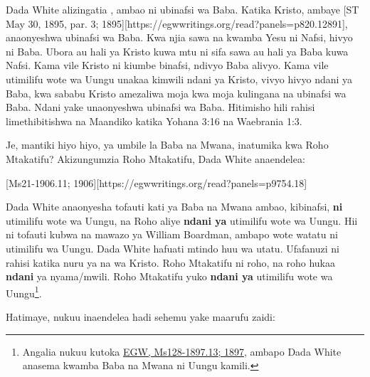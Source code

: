 Dada White alizingatia , ambao ni ubinafsi wa Baba. Katika Kristo, ambaye [ST May 30, 1895, par. 3; 1895][https://egwwritings.org/read?panels=p820.12891], anaonyeshwa ubinafsi wa Baba. Kwa njia sawa na kwamba Yesu ni Nafsi, hivyo ni Baba. Ubora au hali ya Kristo kuwa mtu ni sifa sawa au hali ya Baba kuwa Nafsi. Kama vile Kristo ni kiumbe binafsi, ndivyo Baba alivyo. Kama vile utimilifu wote wa Uungu unakaa kimwili ndani ya Kristo, vivyo hivyo ndani ya Baba, kwa sababu Kristo amezaliwa moja kwa moja kulingana na ubinafsi wa Baba. Ndani yake unaonyeshwa ubinafsi wa Baba. Hitimisho hili rahisi limethibitishwa na Maandiko katika Yohana 3:16 na Waebrania 1:3.


Je, mantiki hiyo hiyo, ya umbile la Baba na Mwana, inatumika kwa Roho Mtakatifu? Akizungumzia Roho Mtakatifu, Dada White anaendelea:


[Ms21-1906.11; 1906][https://egwwritings.org/read?panels=p9754.18]


Dada White anaonyesha tofauti kati ya Baba na Mwana ambao, kibinafsi, \textbf{ni} utimilifu wote wa Uungu, na Roho aliye \textbf{ndani ya} utimilifu wote wa Uungu. Hii ni tofauti kubwa na mawazo ya William Boardman, ambapo wote watatu ni utimilifu wa Uungu. Dada White hafuati mtindo huu wa utatu. Ufafanuzi ni rahisi katika nuru ya  na wa Kristo. Roho Mtakatifu ni roho, na roho hukaa \textbf{ndani} ya nyama/mwili. Roho Mtakatifu yuko \textbf{ndani ya} utimilifu wote wa Uungu\footnote{Angalia nukuu kutoka \href{https://egwwritings.org/?ref=en_Ms128-1897.13&para=5426.19}{{EGW, Ms128-1897.13; 1897}}, ambapo Dada White anasema kwamba Baba na Mwana ni Uungu kamili.}.


Hatimaye, nukuu inaendelea hadi sehemu yake maarufu zaidi:



